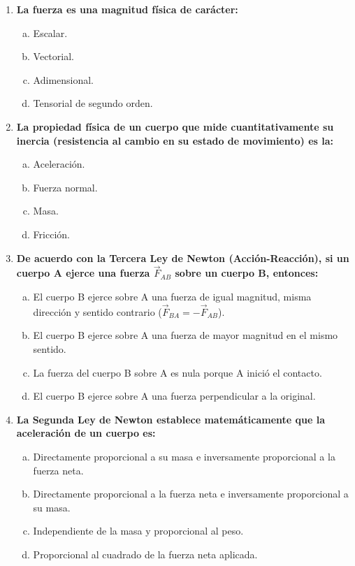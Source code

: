 \documentclass[11pt,a4paper]{article}
\begin{document}
\begin{enumerate}
    \item \textbf{La fuerza es una magnitud física de carácter:}
    \begin{enumerate}[a)]
        \item Escalar.
        \item Vectorial.
        \item Adimensional.
        \item Tensorial de segundo orden.
    \end{enumerate}

    \item \textbf{La propiedad física de un cuerpo que mide cuantitativamente su inercia (resistencia al cambio en su estado de movimiento) es la:}
    \begin{enumerate}[a)]
        \item Aceleración.
        \item Fuerza normal.
        \item Masa.
        \item Fricción.
    \end{enumerate}

    \item \textbf{De acuerdo con la Tercera Ley de Newton (Acción-Reacción), si un cuerpo A ejerce una fuerza $\vec{F}_{AB}$ sobre un cuerpo B, entonces:}
    \begin{enumerate}[a)]
        \item El cuerpo B ejerce sobre A una fuerza de igual magnitud, misma dirección y sentido contrario ($\vec{F}_{BA} = -\vec{F}_{AB}$).
        \item El cuerpo B ejerce sobre A una fuerza de mayor magnitud en el mismo sentido.
        \item La fuerza del cuerpo B sobre A es nula porque A inició el contacto.
        \item El cuerpo B ejerce sobre A una fuerza perpendicular a la original.
    \end{enumerate}

    \item \textbf{La Segunda Ley de Newton establece matemáticamente que la aceleración de un cuerpo es:}
    \begin{enumerate}[a)]
        \item Directamente proporcional a su masa e inversamente proporcional a la fuerza neta.
        \item Directamente proporcional a la fuerza neta e inversamente proporcional a su masa.
        \item Independiente de la masa y proporcional al peso.
        \item Proporcional al cuadrado de la fuerza neta aplicada.
    \end{enumerate}

\end{enumerate}
\end{document}
